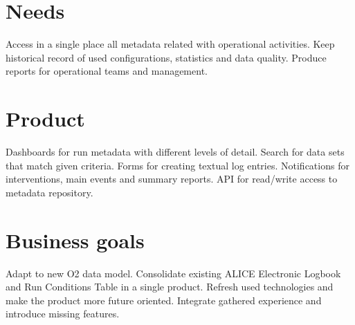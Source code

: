 \documentclass[a4paper,11pt]{book}
\begin{document}
\section{Needs}
Access in a single place all metadata related with operational activities. Keep historical record of used configurations, statistics and data quality. Produce reports for operational teams and management. 

\section{Product}
Dashboards for run metadata with different levels of detail. Search for data sets that match given criteria. Forms for creating textual log entries. Notifications for interventions, main events and summary reports. API for read/write access to metadata repository. 


\section{Business goals}
Adapt to new O2 data model. Consolidate existing ALICE Electronic Logbook and Run Conditions Table in a single product. Refresh used technologies and make the product more future oriented. Integrate gathered experience and introduce missing features. 
\end{document}
